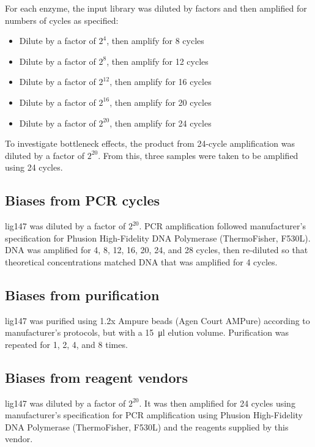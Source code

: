 \documentclass[parskip=full, numbers=noenddot]{scrreprt}
\begin{document}
For each enzyme, the input library was diluted by factors and then amplified for numbers of cycles as specified:

\begin{itemize}
  \item Dilute by a factor of $2^{4}$, then amplify for 8 cycles
  \item Dilute by a factor of $2^{8}$, then amplify for 12 cycles
  \item Dilute by a factor of $2^{12}$, then amplify for 16 cycles
  \item Dilute by a factor of $2^{16}$, then amplify for 20 cycles
  \item Dilute by a factor of $2^{20}$, then amplify for 24 cycles
\end{itemize}
    
To investigate bottleneck effects, the product from 24-cycle amplification was diluted by a factor of $2^{20}$.  From this, three samples were taken to be amplified using 24 cycles.

\subsection{Biases from PCR cycles}
\label{ssec:pcrbias_methods_pcr}

lig147 was diluted by a factor of $2^{20}$.  PCR amplification followed manufacturer's specification for Phusion High-Fidelity DNA Polymerase (ThermoFisher, F530L).  DNA was amplified for 4, 8, 12, 16, 20, 24, and 28 cycles, then re-diluted so that theoretical concentrations matched DNA that was amplified for 4 cycles.

\subsection{Biases from purification}
\label{ssec:pcrbias_methods_pur}

lig147 was purified using 1.2x Ampure beads (Agen Court AMPure) according to manufacturer's protocols, but with a \SI{15}{\micro\litre} elution volume.  Purification was repeated for 1, 2, 4, and 8 times.

\subsection{Biases from reagent vendors}
\label{ssec:pcrbias_methods_reagent}

lig147 was diluted by a factor of $2^{20}$.  It was then amplified for 24 cycles using manufacturer's specification for PCR amplification using Phusion High-Fidelity DNA Polymerase (ThermoFisher, F530L) and the reagents supplied by this vendor.
\end{document}
